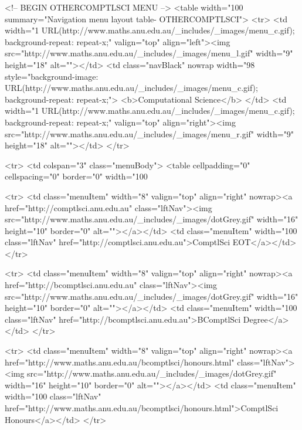 \begin{html}
<!-- BEGIN OTHERCOMPTLSCI MENU -->
<table width="100%
summary="Navigation menu layout table- OTHERCOMPTLSCI">
<tr>
  <td width="1%
  URL(http://www.maths.anu.edu.au/_includes/_images/menu_c.gif); background-repeat: repeat-x;"
  valign="top" align="left"><img src="http://www.maths.anu.edu.au/_includes/_images/menu_l.gif"
  width="9" height="18" alt=""></td>
                <td class="navBlack" nowrap width="98%
  style="background-image: URL(http://www.maths.anu.edu.au/_includes/_images/menu_c.gif);
  background-repeat: repeat-x;">
  <b>Computational Science</b>
  </td>
  <td width="1%
  URL(http://www.maths.anu.edu.au/_includes/_images/menu_c.gif); background-repeat: repeat-x;"
  valign="top" align="right"><img src="http://www.maths.anu.edu.au/_includes/_images/menu_r.gif"
  width="9" height="18" alt=""></td>
</tr>

<tr>
  <td colspan="3" class="menuBody">
  <table cellpadding="0" cellspacing="0" border="0"
  width="100%


<tr>
    <td class="menuItem" width="8"
    valign="top" align="right" nowrap><a
    href="http://comptlsci.anu.edu.au"
    class="lftNav"><img src="http://www.maths.anu.edu.au/_includes/_images/dotGrey.gif" width="16"
    height="10" border="0" alt=""></a></td>
    <td class="menuItem" width="100%
    class="lftNav"
    href="http://comptlsci.anu.edu.au">ComptlSci EOT</a></td>
  </tr>



  <tr>
    <td class="menuItem" width="8"
    valign="top" align="right" nowrap><a
    href="http://bcomptlsci.anu.edu.au"
    class="lftNav"><img src="http://www.maths.anu.edu.au/_includes/_images/dotGrey.gif" width="16"
    height="10" border="0" alt=""></a></td>
    <td class="menuItem" width="100%
    class="lftNav"
    href="http://bcomptlsci.anu.edu.au">BComptlSci Degree</a></td>
  </tr>

    <tr>
    <td class="menuItem" width="8"
    valign="top" align="right" nowrap><a
    href="http://www.maths.anu.edu.au/bcomptlsci/honours.html"
    class="lftNav"><img src="http://www.maths.anu.edu.au/_includes/_images/dotGrey.gif" width="16"
    height="10" border="0" alt=""></a></td>
    <td class="menuItem" width="100%
    class="lftNav"
    href="http://www.maths.anu.edu.au/bcomptlsci/honours.html">ComptlSci Honours</a></td>
  </tr>



\end{html}
